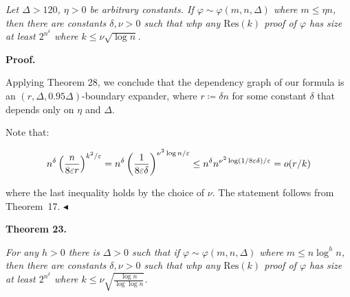 \emph{Let $\Delta>120$, $\eta>0$ be arbitrary constants. If $\varphi\sim\varphi(m,n,\Delta)$
where $m\leq\eta n$, then there are constants $\delta,\nu>0$ such that whp any $\mathrm{Res}(k)$ proof of
$\varphi$ has size at least $2^{n^{\delta}}$ where $k\leq\nu\sqrt{\log{n}}$.}\par






\par\medskip\noindent\textbf{Proof.}\par




Applying Theorem 28, we conclude that the
dependency graph of our formula is an $(r,\Delta,0.95\Delta)$-boundary expander, where $r\coloneqq\delta n$ for some constant $\delta$ that depends only on $\eta$ and $\Delta$.\par




Note that:\par


\[\begin{gathered}
n^{\delta}\left(\frac{n}{8\varepsilon r}\right)^{k^{2}/\varepsilon}=n^{\delta}%
\left(\frac{1}{8\varepsilon\delta}\right)^{\nu^{2}\log n/\varepsilon}\leq n^{%
\delta}n^{\nu^{2}\log(1/8\varepsilon\delta)/\varepsilon}=o(r/k)
\end{gathered}\]


where the last inequality holds by the choice of $\nu$. The statement follows from Theorem 17.
$\blacktriangleleft$\par





\par\medskip\noindent\textbf{
\textbf{Theorem 23}\textbf{.}
}\par



\emph{For any $h>0$ there is $\Delta>0$ such that if $\varphi\sim\varphi(m,n,\Delta)$ where
$m\leq n\log^{h}n$, then there are constants $\delta,\nu>0$ such that whp any $\mathrm{Res}(k)$ proof of
$\varphi$ has size at least $2^{n^{\delta}}$ where $k\leq\nu\sqrt{\frac{\log{n}}{\log\log n}}$.}\par








